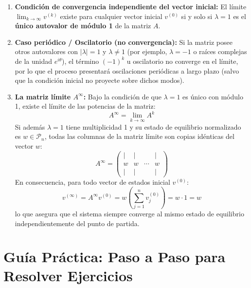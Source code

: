 \documentclass[11pt,a4paper]{article}
\theoremstyle{definition}
\begin{document}
\begin{enumerate}
    \item \textbf{Condición de convergencia independiente del vector inicial:}
    El límite $\lim_{k \to \infty} v^{(k)}$ existe para cualquier vector inicial $v^{(0)}$ si y solo si $\lambda = 1$ es el \textbf{único autovalor de módulo 1} de la matriz $A$.
    
    \item \textbf{Caso periódico / Oscilatorio (no convergencia):}
    Si la matriz posee otros autovalores con $|\lambda| = 1$ y $\lambda \neq 1$ (por ejemplo, $\lambda = -1$ o raíces complejas de la unidad $e^{i\theta}$), el término $(-1)^k$ u oscilatorio no converge en el límite, por lo que el proceso presentará oscilaciones periódicas a largo plazo (salvo que la condición inicial no proyecte sobre dichos modos).

    \item \textbf{La matriz límite $A^\infty$:}
    Bajo la condición de que $\lambda = 1$ es único con módulo 1, existe el límite de las potencias de la matriz:
    \[
    A^\infty = \lim_{k \to \infty} A^k
    \]
    Si además $\lambda = 1$ tiene multiplicidad 1 y su estado de equilibrio normalizado es $w \in \mathcal{P}_n$, todas las columnas de la matriz límite son copias idénticas del vector $w$:
    \[
    A^\infty = \begin{pmatrix}
        \vert & \vert & & \vert \\
        w & w & \cdots & w \\
        \vert & \vert & & \vert
    \end{pmatrix}
    \]
    En consecuencia, para todo vector de estados inicial $v^{(0)}$:
    \[
    v^{(\infty)} = A^\infty v^{(0)} = w \left( \sum_{j=1}^n v_j^{(0)} \right) = w \cdot 1 = w
    \]
    lo que asegura que el sistema siempre converge al mismo estado de equilibrio independientemente del punto de partida.
\end{enumerate}

\section{Guía Práctica: Paso a Paso para Resolver Ejercicios}
\end{document}
